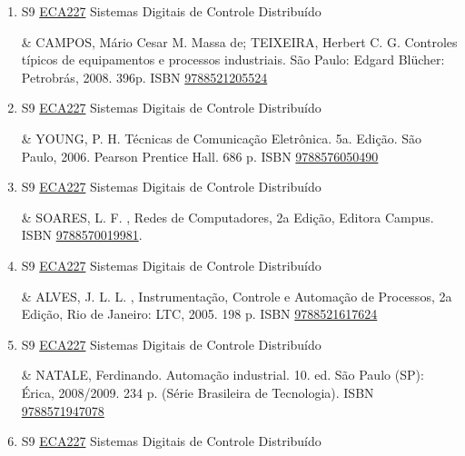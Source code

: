 \documentclass[12pt,a4paper]{book}
\begin{document}
\begin{enumerate}
 \item S9 \hyperref[PUD:ECA227]{ECA227} Sistemas Digitais de Controle Distribuído

& CAMPOS, Mário Cesar M.  Massa de;  TEIXEIRA, Herbert C.  G.  Controles típicos de equipamentos e processos industriais.  São Paulo: Edgard Blücher: Petrobrás, 2008.  396p.  ISBN \href{http://www.bn.br/site/pages/servicosProfissionais/agenciaISBN/isbnBusca/FbnBuscaISBNCatalogo.asp?pField=ISBN&pIntPagina=1&pISBN=21205524&nidbISBN=true&hidbISBN=true}{9788521205524} 
 

 \item S9 \hyperref[PUD:ECA227]{ECA227} Sistemas Digitais de Controle Distribuído

&   YOUNG, P.  H.  Técnicas de Comunicação Eletrônica.  5a.  Edição.  São Paulo, 2006.  Pearson Prentice Hall.  686 p.  ISBN \href{http://www.bn.br/site/pages/servicosProfissionais/agenciaISBN/isbnBusca/FbnBuscaISBNCatalogo.asp?pField=ISBN&pIntPagina=1&pISBN=76050490&nidbISBN=true&hidbISBN=true}{9788576050490}
 

 \item S9 \hyperref[PUD:ECA227]{ECA227} Sistemas Digitais de Controle Distribuído

&  SOARES, L.  F. , Redes de Computadores, 2a Edição, Editora Campus.  ISBN \href{http://www.bn.br/site/pages/servicosProfissionais/agenciaISBN/isbnBusca/FbnBuscaISBNCatalogo.asp?pField=ISBN&pIntPagina=1&pISBN=70019981&nidbISBN=true&hidbISBN=true}{9788570019981}.
 \item S9 \hyperref[PUD:ECA227]{ECA227} Sistemas Digitais de Controle Distribuído

&   ALVES, J.  L.  L. , Instrumentação, Controle e Automação de Processos, 2a Edição, Rio de Janeiro: LTC, 2005.  198 p.  ISBN \href{http://www.bn.br/site/pages/servicosProfissionais/agenciaISBN/isbnBusca/FbnBuscaISBNCatalogo.asp?pField=ISBN&pIntPagina=1&pISBN=21617624&nidbISBN=true&hidbISBN=true}{9788521617624}
 

 \item S9 \hyperref[PUD:ECA227]{ECA227} Sistemas Digitais de Controle Distribuído

&  NATALE, Ferdinando.  Automação industrial.  10. ed.  São Paulo (SP): Érica, 2008/2009.  234 p.  (Série Brasileira de Tecnologia).  ISBN \href{http://www.bn.br/site/pages/servicosProfissionais/agenciaISBN/isbnBusca/FbnBuscaISBNCatalogo.asp?pField=ISBN&pIntPagina=1&pISBN=71947078&nidbISBN=true&hidbISBN=true}{9788571947078}
 

 \item S9 \hyperref[PUD:ECA227]{ECA227} Sistemas Digitais de Controle Distribuído


\end{enumerate}
\end{document}
